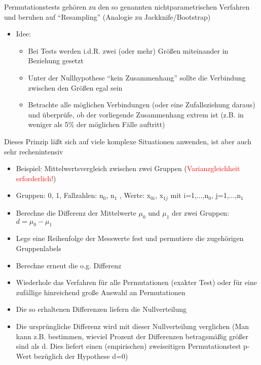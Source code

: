 Permutationstests gehören zu den so genannten nichtparametrischen Verfahren und beruhen auf “Resampling” (Analogie zu Jackknife/Bootstrap)

\begin{itemize}
	\item Idee:
	\begin{itemize}
		\item Bei Tests werden i.d.R. zwei (oder mehr) Größen miteinander in Beziehung gesetzt
		\item Unter der Nullhypothese “kein Zusammenhang” sollte die Verbindung zwischen den Größen egal sein
		\item Betrachte alle möglichen Verbindungen (oder eine Zufallsziehung daraus) und überprüfe, ob der vorliegende Zusammenhang extrem ist (z.B. in weniger als 5\% der möglichen Fälle auftritt)
	\end{itemize}
\end{itemize}

Dieses Prinzip läßt sich auf viele komplexe Situationen anwenden, ist aber auch sehr rechenintensiv

\begin{itemize}
	\item Beispiel: Mittelwertsvergleich zwischen zwei Gruppen (\textcolor{red}{Varianzgleichheit erforderlich!})
	\item Gruppen: 0, 1, Fallzahlen: n$_0$, n$_1$ , Werte: x$_{0i}$, x$_{1j}$ mit i=1,...,n$_0$, j=1,...,n$_1$
	\item Berechne die Differenz der Mittelwerte $\mu_0$ und $\mu_1$ der zwei Gruppen: $d=\mu_0-\mu_1$
	\item Lege eine Reihenfolge der Messwerte fest und permutiere die zugehörigen Gruppenlabels
	\item Berechne erneut die o.g. Differenz
	\item Wiederhole das Verfahren für alle Permutationen (exakter Test) oder für eine zufällige hinreichend große Auswahl an Permutationen
	\item Die so erhaltenen Differenzen liefern die Nullverteilung
	\item Die ursprüngliche Differenz wird mit dieser Nullverteilung verglichen (Man kann z.B. bestimmen, wieviel Prozent der Differenzen betragsmäßig größer sind als d. Dies liefert einen (empirischen) zweiseitigen Permutationstest p-Wert bezüglich der Hypothese d=0)
\end{itemize}